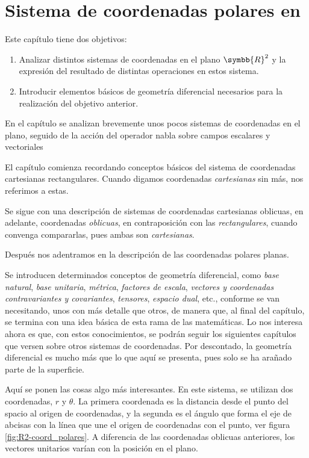 %

\chapter{Sistema de coordenadas polares en
  }
Este capítulo tiene dos objetivos:
\begin{enumerate}
\item Analizar distintos sistemas de coordenadas en el plano $\symbb{R}^2$ y la expresión
  del resultado de distintas operaciones en estos sistema.
\item Introducir elementos básicos de geometría diferencial necesarios para la
  realización del objetivo anterior.
\end{enumerate}

En el capítulo se analizan brevemente unos pocos sistemas de coordenadas en el plano,
seguido de la acción del operador nabla sobre campos escalares y vectoriales

El capítulo comienza recordando conceptos básicos del sistema de coordenadas cartesianas
rectangulares. Cuando digamos coordenadas \emph{cartesianas} sin más, nos referimos a
estas.

Se sigue con una descripción de sistemas de coordenadas cartesianas oblicuas, en adelante, coordenadas \emph{oblicuas}, en contraposición con las \emph{rectangulares},
cuando convenga compararlas, pues ambas son \emph{cartesianas}.

Después nos adentramos en la descripción de las coordenadas polares planas.

Se introducen determinados conceptos de geometría diferencial, como \emph{base natural},
\emph{base unitaria}, \emph{métrica}, \emph{factores de escala},
\emph{vectores y coordenadas contravariantes y covariantes}, \emph{tensores},
\emph{espacio dual}, etc., conforme se van necesitando, unos con más detalle que otros,
de manera que, al final del capítulo, se termina con una idea básica de esta rama de las
matemáticas. Lo nos interesa ahora es que, con estos conocimientos, se podrán seguir los
siguientes capítulos que versen sobre otros sistemas de coordenadas. Por descontado, la
geometría diferencial es mucho más que lo que aquí se presenta, pues solo se ha arañado
parte de la superficie.


Aquí se ponen las cosas algo más interesantes. En este sistema, se utilizan dos
coordenadas, $r$ y $\theta$. La primera coordenada es la distancia desde el punto del spacio al origen de coordenadas, y la segunda es el ángulo que forma el eje de abcisas
con la línea que une el origen de coordenadas con el punto, ver figura
\ref{fig:R2-coord_polares}. A diferencia de las coordenadas oblicuas anteriores, los
vectores unitarios varían con la posición en el plano.

